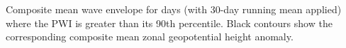 \label{fig:envelope_climatology}
Composite mean wave envelope for days (with 30-day running mean applied) where the PWI is greater than its 90th percentile. Black contours show the corresponding composite mean zonal geopotential height anomaly.  